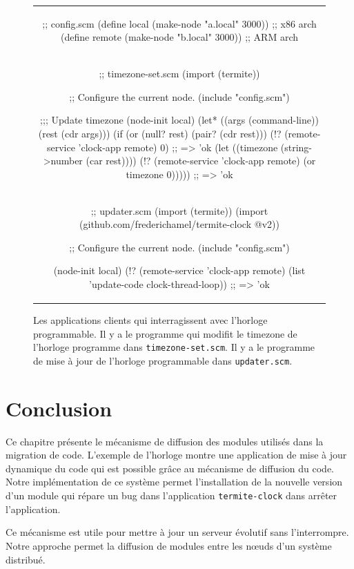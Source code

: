\begin{figure}[ht]
  \centering\fontsize{8}{7}
  \begin{tabular}{c}
\begin{mplisting}{0.75}
;; config.scm
(define local    (make-node "a.local" 3000)) ;; x86 arch
(define remote   (make-node "b.local" 3000)) ;; ARM arch
\end{mplisting}\\

\begin{mplisting}{0.75}
;; timezone-set.scm
(import (termite))

;; Configure the current node.
(include "config.scm")

;;; Update timezone
(node-init local)
(let* ((args (command-line))
       (rest (cdr args)))
  (if (or (null? rest)
          (pair? (cdr rest)))
      (!? (remote-service 'clock-app remote) 0) ;; => 'ok
      (let ((timezone (string->number (car rest))))
        (!? (remote-service 'clock-app remote) (or timezone 0))))) ;; => 'ok
\end{mplisting}\\

\begin{mplisting}{0.75}
;; updater.scm
(import (termite))
(import (github.com/frederichamel/termite-clock @v2))

;; Configure the current node.
(include "config.scm")

(node-init local)
(!? (remote-service 'clock-app remote)
    (list 'update-code clock-thread-loop)) ;; => 'ok
\end{mplisting}
  \end{tabular}
  \caption{Les applications clients qui interragissent avec
    l'horloge programmable. Il y a le programme qui modifit
    le timezone de l'horloge programme dans \texttt{timezone-set.scm}.
    Il y a le programme de mise à jour de l'horloge programmable
    dans \texttt{updater.scm}.}
  \vspace*{4ex}
  \label{fig:termite_clock_client}
\end{figure}

\section{Conclusion}
Ce chapitre présente le mécanisme de diffusion des modules utilisés
dans la migration de code. L'exemple de l'horloge montre une application
de mise à jour dynamique du code qui est possible grâce au mécanisme
de diffusion du code. Notre implémentation de ce système permet l'installation
de la nouvelle version d'un module qui répare un bug dans l'application
\texttt{termite-clock} dans arrêter l'application.

Ce mécanisme est utile pour mettre à jour un serveur évolutif
sans l'interrompre. Notre approche permet la diffusion de modules
entre les nœuds d'un système distribué.

